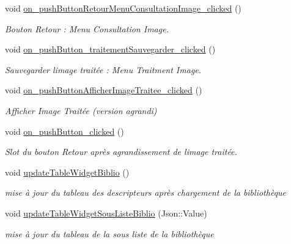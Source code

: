\begin{DoxyCompactItemize}
\mbox{\label{classMainWindow_ad2834e748144af0bfad4218e0b324eeb}} 
void \hyperlink{classMainWindow_ad2834e748144af0bfad4218e0b324eeb}{on\+\_\+push\+Button\+Retour\+Menu\+Consultation\+Image\+\_\+clicked} ()
\begin{DoxyCompactList}\small\item\em Bouton Retour \+: Menu Consultation Image. \end{DoxyCompactList}\item 
\mbox{\label{classMainWindow_a6469f0c600cec5c950ce8e6ea6ea8b30}} 
void \hyperlink{classMainWindow_a6469f0c600cec5c950ce8e6ea6ea8b30}{on\+\_\+push\+Button\+\_\+traitement\+Sauvegarder\+\_\+clicked} ()
\begin{DoxyCompactList}\small\item\em Sauvegarder l\textquotesingle{}image traitée \+: Menu Traitment Image. \end{DoxyCompactList}\item 
\mbox{\label{classMainWindow_ae4205e696ff8a01767c88add581c4067}} 
void \hyperlink{classMainWindow_ae4205e696ff8a01767c88add581c4067}{on\+\_\+push\+Button\+Afficher\+Image\+Traitee\+\_\+clicked} ()
\begin{DoxyCompactList}\small\item\em Afficher Image Traitée (version agrandi) \end{DoxyCompactList}\item 
\mbox{\label{classMainWindow_a4de79c63c7fa0b8d7c468ac71f20be81}} 
void \hyperlink{classMainWindow_a4de79c63c7fa0b8d7c468ac71f20be81}{on\+\_\+push\+Button\+\_\+clicked} ()
\begin{DoxyCompactList}\small\item\em Slot du bouton Retour après agrandissement de l\textquotesingle{}image traitée. \end{DoxyCompactList}\item 
\mbox{\label{classMainWindow_a3d2244f7cd6754e296d550a8774db184}} 
void \hyperlink{classMainWindow_a3d2244f7cd6754e296d550a8774db184}{update\+Table\+Widget\+Biblio} ()
\begin{DoxyCompactList}\small\item\em mise à jour du tableau des descripteurs après chargement de la bibliothèque \end{DoxyCompactList}\item 
\mbox{\label{classMainWindow_a2c69407063bbc24fae04879a40fd762d}} 
void \hyperlink{classMainWindow_a2c69407063bbc24fae04879a40fd762d}{update\+Table\+Widget\+Sous\+Liste\+Biblio} (Json\+::\+Value)
\begin{DoxyCompactList}\small\item\em mise à jour du tableau de la sous liste de la bibliothèque \end{DoxyCompactList}\end{DoxyCompactItemize}
